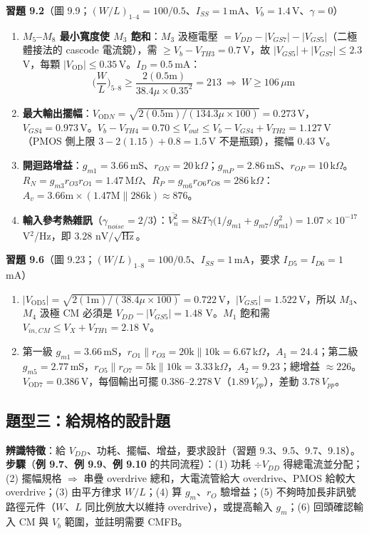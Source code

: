 \documentclass[11pt,a4paper]{article}
\newcommand{\pl}{\mathbin{\|}}
\newcommand{\OD}[1]{V_{\text{OD}#1}}
\newcommand{\exref}[1]{\textcolor{extag}{\textbf{\sffamily 例 #1}}}
\begin{document}
\textbf{習題 9.2}（圖 9.9；$(W/L)_{1\text{--}4}=100/0.5$、$I_{SS}=1$\,mA、$V_b=1.4$\,V、$\gamma=0$）
\begin{enumerate}[label=(\alph*),leftmargin=2.2em]
  \item \textbf{$M_5$--$M_8$ 最小寬度使 $M_3$ 飽和}：$M_3$ 汲極電壓 $=V_{DD}-|V_{GS7}|-|V_{GS5}|$（二極體接法的 cascode 電流鏡），需 $\ge V_b-V_{TH3}=0.7$\,V，故 $|V_{GS5}|+|V_{GS7}|\le2.3$\,V，每顆 $|\OD{}|\le0.35$\,V。$I_D=0.5$\,mA：
  \[\Big(\frac WL\Big)_{5\text{--}8}\ge\frac{2(0.5\text{m})}{38.4\mu\times0.35^2}=213\ \Rightarrow\ \boxed{W\ge106\,\mu\text{m}}\]
  \item \textbf{最大輸出擺幅}：$\OD{N}=\sqrt{2(0.5\text{m})/(134.3\mu\times100)}=0.273$\,V，$V_{GS4}=0.973$\,V。$V_b-V_{TH4}=0.70\le V_{out}\le V_b-V_{GS4}+V_{TH2}=1.127$\,V（PMOS 側上限 $3-2(1.15)+0.8=1.5$\,V 不是瓶頸），擺幅 $\boxed{0.43\text{ V}}$。
  \item \textbf{開迴路增益}：$g_{m1}=3.66$\,mS、$r_{ON}=20$\,k$\Omega$；$g_{mP}=2.86$\,mS、$r_{OP}=10$\,k$\Omega$。$R_N=g_{m3}r_{O3}r_{O1}=1.47$\,M$\Omega$、$R_P=g_{m6}r_{O6}r_{O8}=286$\,k$\Omega$：$A_v=3.66\text{m}\times(1.47\text{M}\pl286\text{k})\approx\boxed{876}$。
  \item \textbf{輸入參考熱雜訊}（$\gamma_{noise}=2/3$）：$\overline{V_n^2}=8kT\gamma\big(1/g_{m1}+g_{m7}/g_{m1}^2\big)=1.07\times10^{-17}$\,V$^2$/Hz，即 $\boxed{3.28\text{ nV}/\sqrt{\text{Hz}}}$。
\end{enumerate}

\textbf{習題 9.6}（圖 9.23；$(W/L)_{1\text{--}8}=100/0.5$、$I_{SS}=1$\,mA，要求 $I_{D5}=I_{D6}=1$\,mA）
\begin{enumerate}[label=(\alph*),leftmargin=2.2em]
  \item $|\OD5|=\sqrt{2(1\text{m})/(38.4\mu\times100)}=0.722$\,V，$|V_{GS5}|=1.522$\,V，所以 $M_3$、$M_4$ 汲極 CM 必須是 $V_{DD}-|V_{GS5}|=\boxed{1.48\text{ V}}$。$M_1$ 飽和需 $V_{in,CM}\le V_X+V_{TH1}=\boxed{2.18\text{ V}}$。
  \item 第一級 $g_{m1}=3.66$\,mS，$r_{O1}\pl r_{O3}=20\text{k}\pl10\text{k}=6.67$\,k$\Omega$，$A_1=24.4$；第二級 $g_{m5}=2.77$\,mS，$r_{O5}\pl r_{O7}=5\text{k}\pl10\text{k}=3.33$\,k$\Omega$，$A_2=9.23$；總增益 $\boxed{\approx226}$。$\OD7=0.386$\,V，每個輸出可擺 $0.386$--$2.278$\,V（$1.89\,V_{pp}$），差動 $\boxed{3.78\,V_{pp}}$。
\end{enumerate}

\subsection{題型三：給規格的設計題}
\textbf{辨識特徵}：給 $V_{DD}$、功耗、擺幅、增益，要求設計（習題 9.3、9.5、9.7、9.18）。\textbf{步驟}（\exref{9.7}、\exref{9.9}、\exref{9.10} 的共同流程）：(1) 功耗 $\div V_{DD}$ 得總電流並分配；(2) 擺幅規格 $\Rightarrow$ 串疊 overdrive 總和，大電流管給大 overdrive、PMOS 給較大 overdrive；(3) 由平方律求 $W/L$；(4) 算 $g_m$、$r_O$ 驗增益；(5) 不夠時加長非訊號路徑元件（$W$、$L$ 同比例放大以維持 overdrive），或提高輸入 $g_m$；(6) 回頭確認輸入 CM 與 $V_b$ 範圍，並註明需要 CMFB。
\end{document}
